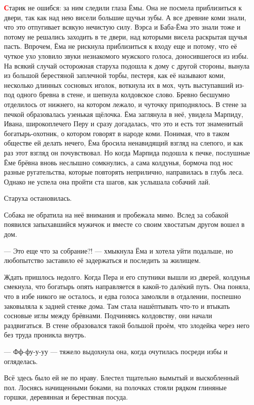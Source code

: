 \documentclass[oneside,final,14pt]{extreport}
\begin{document}
	\lettrine[findent=0pt]{\textbf{\textcolor{red}{С}}}{}тарик не ошибся: за ним следили глаза Ёмы. Она не посмела приблизиться к двери, так как над нею висели большие щучьи зубы. А все древние коми знали, что это отпугивает всякую нечистую силу. Вэрса и Баба-Ёма это знали тоже и потому не решались заходить в те двери, над которыми висела раскрытая щучья пасть. Впрочем, Ёма не рискнула приблизиться к входу еще и потому, что её чуткое ухо уловило звуки незнакомого мужского голоса, доносившегося из избы. На всякий случай осторожная старуха подошла к дому с другой стороны, вынула из большой берестяной заплечной торбы, пестеря, как её называют коми, несколько длинных сосновых иголок, воткнула их в мох, чуть выступавший из-под одного бревна в стене, и шепнула колдовское слово. Бревно бесшумно отделилось от нижнего, на котором лежало, и чуточку приподнялось. В стене за печкой образовалась узенькая щёлочка. Ёма заглянула в неё, увидела Марпиду, Ивана, широкоплечего Перу и сразу догадалась, что это и есть тот знаменитый богатырь-охотник, о котором говорят в народе коми. Понимая, что в таком обществе ей делать нечего, Ёма бросила ненавидящий взгляд на слепого, и как раз этот взгляд он почувствовал. Но когда Марпида подошла к печке, послушные Ёме брёвна вновь неслышно сомкнулись, а сама колдунья, бормоча под нос разные ругательства, которые повторять неприлично, направилась в глубь леса. Однако не успела она пройти ста шагов, как услышала собачий лай.
	
	Старуха остановилась.
	
	Собака не обратила на неё внимания и пробежала мимо. Вслед за собакой появился запыхавшийся мужичок и вместе со своим хвостатым другом вошел в дом.
	
	— Это еще что за собрание?! — хмыкнула Ёма и хотела уйти подальше, но любопытство заставило её задержаться и последить за жилищем.
	
	Ждать пришлось недолго. Когда Пера и его спутники вышли из дверей, колдунья смекнула, что богатырь опять направляется в какой-то далёкий путь. Она поняла, что в избе никого не осталось, и едва голоса замолкли в отдалении, поспешно заковыляла к задней стенке дома. Там стала нашёптывать что-то и втыкать сосновые иглы между брёвнами. Подчиняясь колдовству, они начали раздвигаться. В стене образовался такой большой проём, что злодейка через него без труда проникла внутрь.
	
	— Фф-фу-у-уу — тяжело выдохнула она, когда очутилась посреди избы и огляделась.
	
	Всё здесь было ей не по нраву. Блестел тщательно вымытый и выскобленный пол. Лоснясь начищенными боками, на полочках стояли рядком глиняные горшки, деревянная и берестяная посуда.
	
\end{document}
